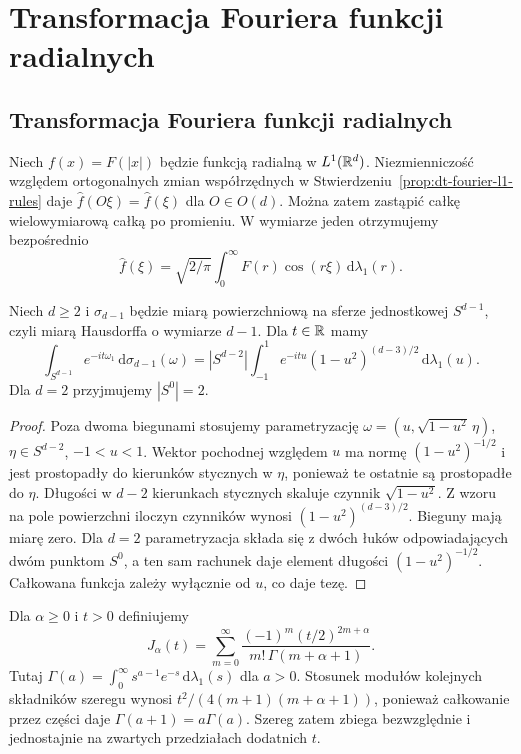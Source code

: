 \section{Transformacja Fouriera funkcji radialnych}
\providecommand{\atlasref}[2]{#2}

\subsection{Transformacja Fouriera funkcji radialnych}

Niech $f(x)=F(|x|)$ będzie funkcją radialną w $L^1(\mathbb R^d)$.
Niezmienniczość względem ortogonalnych zmian współrzędnych
w Stwierdzeniu~\ref{prop:dt-fourier-l1-rules} daje
$\widehat f(O\xi)=\widehat f(\xi)$ dla $O\in O(d)$.
Można zatem zastąpić całkę wielowymiarową całką po
promieniu. W wymiarze jeden otrzymujemy bezpośrednio
\[
 \widehat f(\xi)=\sqrt{2/\pi}\int_0^\infty
 F(r)\cos(r\xi)\,\mathrm d\lambda_1(r).
\]

\begin{lemat}
\label{lem:dt-fourier-sphere-kernel}
Niech $d\ge2$ i $\sigma_{d-1}$ będzie miarą powierzchniową
na sferze jednostkowej $S^{d-1}$, czyli miarą Hausdorffa
o wymiarze $d-1$. Dla $t\in\mathbb R$ mamy
\[
 \int_{S^{d-1}}e^{-it\omega_1}\,\mathrm d\sigma_{d-1}(\omega)
 =|S^{d-2}|\int_{-1}^1 e^{-itu}(1-u^2)^{(d-3)/2}
 \,\mathrm d\lambda_1(u).
\]
Dla $d=2$ przyjmujemy $|S^0|=2$.
\end{lemat}
\begin{proof}
Poza dwoma biegunami stosujemy parametryzację
$\omega=(u,\sqrt{1-u^2}\,\eta)$, $\eta\in S^{d-2}$,
$-1<u<1$. Wektor pochodnej względem $u$ ma normę
$(1-u^2)^{-1/2}$ i jest prostopadły do kierunków
stycznych w $\eta$, ponieważ te ostatnie są prostopadłe
do $\eta$. Długości w $d-2$ kierunkach stycznych
skaluje czynnik $\sqrt{1-u^2}$. Z wzoru na pole
powierzchni iloczyn czynników wynosi
$(1-u^2)^{(d-3)/2}$. Bieguny mają miarę zero.
Dla $d=2$ parametryzacja składa się z dwóch łuków
odpowiadających dwóm punktom $S^0$, a ten sam
rachunek daje element długości $(1-u^2)^{-1/2}$.
Całkowana funkcja zależy wyłącznie od $u$, co daje tezę.
\end{proof}

\begin{definicja}
\label{def:dt-bessel-j}
Dla $\alpha\ge0$ i $t>0$ definiujemy
\[
 J_\alpha(t)=\sum_{m=0}^\infty
 \frac{(-1)^m(t/2)^{2m+\alpha}}
      {m!\,\Gamma(m+\alpha+1)}.
\]
Tutaj $\Gamma(a)=\int_0^\infty
s^{a-1}e^{-s}\,\mathrm d\lambda_1(s)$ dla $a>0$.
Stosunek modułów kolejnych składników szeregu wynosi
$t^2/(4(m+1)(m+\alpha+1))$, ponieważ całkowanie
przez części daje $\Gamma(a+1)=a\Gamma(a)$.
Szereg zatem zbiega bezwzględnie i jednostajnie na
zwartych przedziałach dodatnich $t$.
\end{definicja}

